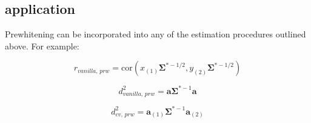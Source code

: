 \documentclass{article}\usepackage[]{graphicx}\usepackage[]{color}
\begin{document}
\subsection*{application}

Prewhitening can be incorporated into any of the estimation procedures outlined above.
For example:

\[r_\textit{vanilla, prw} = \text{cor}(x_{(1)}\mathbf{\Sigma}^{*-1/2}, y_{(2)}\mathbf{\Sigma}^{*-1/2})\]

\[d^2_\textit{vanilla, prw} = \mathbf{a} \mathbf{\Sigma}^{*-1} \mathbf{a}\]

\[d^2_\textit{cv, prw} = \mathbf{a}_{(1)} \mathbf{\Sigma}^{*-1} \mathbf{a}_{(2)}\]
\end{document}
